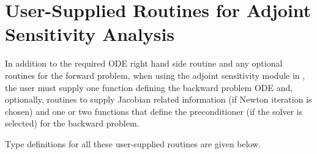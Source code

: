 \section{User-Supplied Routines for Adjoint Sensitivity Analysis}\label{ss:user_fct_adj}

In addition to the required ODE right hand side routine and any optional routines
for the forward problem, when using the adjoint sensitivity module in {\cvodes},
the user must supply one function defining the backward problem ODE and, optionally,
routines to supply Jacobian related information (if Newton iteration is chosen) and
one or two functions that define the preconditioner (if the {\cvspgmr} solver is
selected) for the backward problem.

Type definitions for all these user-supplied routines are given below.

